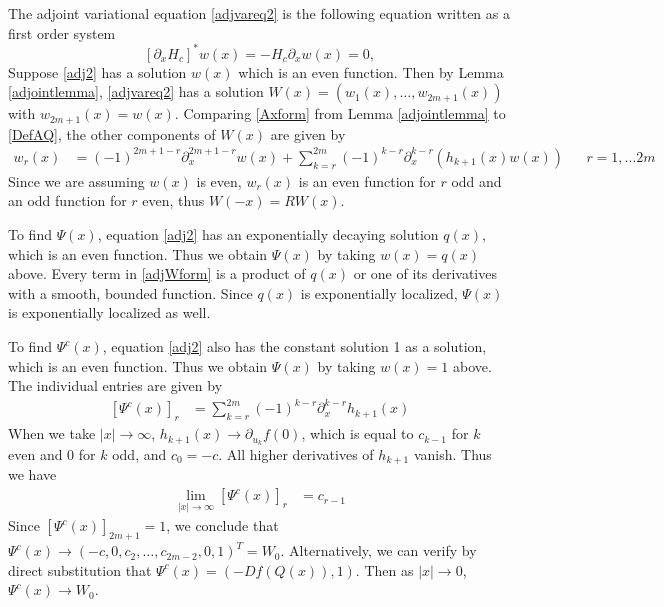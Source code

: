\documentclass[thesis.tex]{subfiles}
\begin{document}
The adjoint variational equation \eqref{adjvareq2} is the following equation written as a first order system
\begin{equation}\label{adj2}
[\partial_x H_c]^* w(x) = -H_c \partial_x w(x) = 0,
\end{equation}
Suppose \eqref{adj2} has a solution $w(x)$ which is an even function. Then by Lemma \ref{adjointlemma}, \eqref{adjvareq2} has a solution $W(x) = (w_1(x), \dots, w_{2m+1}(x))$ with $w_{2m+1}(x) = w(x)$. Comparing \eqref{Axform} from Lemma \ref{adjointlemma} to \eqref{DefAQ}, the other components of $W(x)$ are given by 
\begin{align}\label{adjWform}
w_r(x) &= (-1)^{2m+1-r} \partial_x^{2m+1-r}w(x) + \sum_{k=r}^{2m} (-1)^{k-r} \partial_x^{k-r}(h_{k+1}(x) w(x)) && r = 1, \dots 2m
\end{align}
Since we are assuming $w(x)$ is even, $w_r(x)$ is an even function for $r$ odd and an odd function for $r$ even, thus $W(-x) = R W(x)$. 

To find $\Psi(x)$, equation \ref{adj2} has an exponentially decaying solution $q(x)$, which is an even function. Thus we obtain $\Psi(x)$ by taking $w(x) = q(x)$ above. Every term in \eqref{adjWform} is a product of $q(x)$ or one of its derivatives with a smooth, bounded function. Since $q(x)$ is exponentially localized, $\Psi(x)$ is exponentially localized as well.

To find $\Psi^c(x)$, equation \eqref{adj2} also has the constant solution 1 as a solution, which is an even function. Thus we obtain $\Psi(x)$ by taking $w(x) = 1$ above. The individual entries are given by
\begin{align}\label{Psicrows}
[\Psi^c(x)]_r &= \sum_{k=r}^{2m} (-1)^{k-r} \partial_x^{k-r} h_{k+1}(x)
\end{align}
When we take $|x| \rightarrow \infty$, $h_{k+1}(x) \rightarrow \partial_{u_k}f(0)$, which is equal to $c_{k-1}$ for $k$ even and 0 for $k$ odd, and $c_0 = -c$. All higher derivatives of $h_{k+1}$ vanish. Thus we have
\begin{align*}
\lim_{|x|\rightarrow \infty}
[\Psi^c(x)]_r &= c_{r-1}
\end{align*}
Since $[\Psi^c(x)]_{2m+1} = 1$, we conclude that $\Psi^c(x) \rightarrow (-c, 0, c_2, \dots, c_{2m-2}, 0, 1)^T = W_0$. Alternatively, we can verify by direct substitution that $\Psi^c(x) = ( -Df(Q(x)), 1)$. Then as $|x| \rightarrow 0$, $\Psi^c(x) \rightarrow W_0$.
\end{document}
